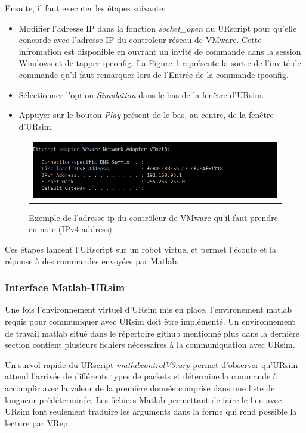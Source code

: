 Ensuite, il faut executer les étapes suivante:
\begin{itemize}
\item Modifier l'adresse IP dans la fonction \textit{socket\_open} du URscript pour qu'elle concorde avec l'adresse IP du controleur réseau de VMware. Cette infromation est disponible en ouvrant un invité de commande dans la session Windows et de tapper ipconfig. La Figure \ref{fig:windows_ip} représente la sortie de l'invité de commande qu'il faut remarquer lors de l'Entrée de la commande ipconfig.
\item Sélectionner l'option \textit{Simulation} dans le bas de la fenêtre d'URsim.
\item Appuyer sur le bouton \textit{Play} présent de le bas, au centre, de la fenêtre d'URsim.
\end{itemize}
\begin{figure}
 \begin{center}
  \begin{tabular}{c}
    \includegraphics[trim=0cm 0cm 0cm 0cm, scale=0.5]{screenshots_tuto_ursim/windows_ip.png}
  \end{tabular}
 \end{center}
\caption{Exemple de l'adresse ip du contrôleur de VMware qu'il faut prendre en note (IPv4 address)}
 \label{fig:windows_ip}
\end{figure}
Ces étapes lancent l'URscript sur un robot virtuel et permet l'écoute et la réponse à des commandes envoyées par Matlab.


\subsubsection{Interface Matlab-URsim}

Une fois l'environnement virtuel d'URsim mis en place, l'environement matlab requis pour communiquer avec URsim doit être implémenté.
Un environnement de travail matlab situé dans le répertoire github mentionné plus dans la dernière section contient plusieurs fichiers nécessaires à la communiquation avec URsim.

Un survol rapide du URscript \textit{matlabcontrolV3.urp} permet d'observer qu'URsim attend l'arrivée de différents types de packets et détermine la commande à accomplir avec la valeur de la première donnée comprise dans une liste de longueur prédéterminée. Les fichiers Matlab permettant de faire le lien avec URsim font seulement traduire les arguments dans la forme qui rend possible la lecture par VRep.

